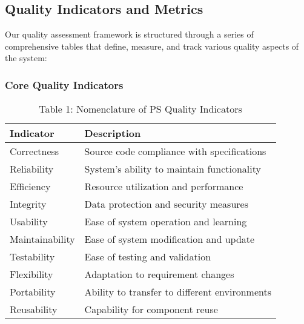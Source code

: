 \documentclass[12pt,a4paper]{report}
\begin{document}
\subsection{Quality Indicators and Metrics}
Our quality assessment framework is structured through a series of comprehensive tables that define, measure, and track various quality aspects of the system:

\subsubsection{Core Quality Indicators}
\begin{table}[H]
\caption{Table 1: Nomenclature of PS Quality Indicators}
\begin{tabularx}{\textwidth}{|>{\hspace{0.5em}}p{}|>{\hspace{0.5em}}X|}
\hline
\rowcolor{tableheadcolor}\textbf{Indicator} & \textbf{Description} \\
\hline
Correctness & Source code compliance with specifications \\
\hline
Reliability & System's ability to maintain functionality \\
\hline
Efficiency & Resource utilization and performance \\
\hline
Integrity & Data protection and security measures \\
\hline
Usability & Ease of system operation and learning \\
\hline
Maintainability & Ease of system modification and update \\
\hline
Testability & Ease of testing and validation \\
\hline
Flexibility & Adaptation to requirement changes \\
\hline
Portability & Ability to transfer to different environments \\
\hline
Reusability & Capability for component reuse \\
\hline
\end{tabularx}
\end{table}
\end{document}
